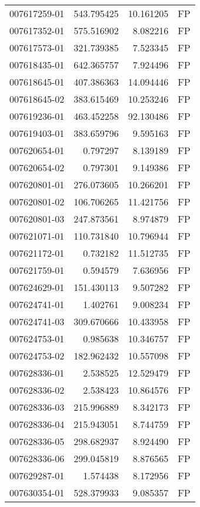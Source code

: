 \begin{tabular}{lrrl}
007617259-01 &  543.795425 &    10.161205 &   FP \\
007617352-01 &  575.516902 &     8.082216 &   FP \\
007617573-01 &  321.739385 &     7.523345 &   FP \\
007618435-01 &  642.365757 &     7.924496 &   FP \\
007618645-01 &  407.386363 &    14.094446 &   FP \\
007618645-02 &  383.615469 &    10.253246 &   FP \\
007619236-01 &  463.452258 &    92.130486 &   FP \\
007619403-01 &  383.659796 &     9.595163 &   FP \\
007620654-01 &    0.797297 &     8.139189 &   FP \\
007620654-02 &    0.797301 &     9.149386 &   FP \\
007620801-01 &  276.073605 &    10.266201 &   FP \\
007620801-02 &  106.706265 &    11.421756 &   FP \\
007620801-03 &  247.873561 &     8.974879 &   FP \\
007621071-01 &  110.731840 &    10.796944 &   FP \\
007621172-01 &    0.732182 &    11.512735 &   FP \\
007621759-01 &    0.594579 &     7.636956 &   FP \\
007624629-01 &  151.430113 &     9.507282 &   FP \\
007624741-01 &    1.402761 &     9.008234 &   FP \\
007624741-03 &  309.670666 &    10.433958 &   FP \\
007624753-01 &    0.985638 &    10.346757 &   FP \\
007624753-02 &  182.962432 &    10.557098 &   FP \\
007628336-01 &    2.538525 &    12.529479 &   FP \\
007628336-02 &    2.538423 &    10.864576 &   FP \\
007628336-03 &  215.996889 &     8.342173 &   FP \\
007628336-04 &  215.943051 &     8.744759 &   FP \\
007628336-05 &  298.682937 &     8.924490 &   FP \\
007628336-06 &  299.045819 &     8.876565 &   FP \\
007629287-01 &    1.574438 &     8.172956 &   FP \\
007630354-01 &  528.379933 &     9.085357 &   FP \\

\end{tabular}
